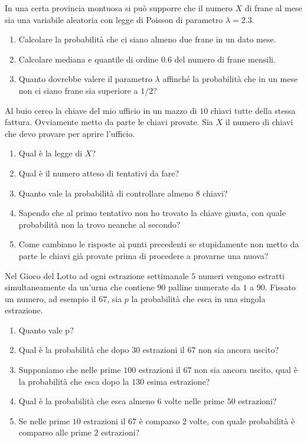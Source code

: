 
In una certa provincia montuosa si può supporre che il numero $X$ di frane al mese sia una variabile aleatoria con legge di Poisson di parametro $\lambda =2.3$.
\begin{enumerate}
\item Calcolare la probabilità che ci siano almeno due frane in un dato mese.
\item Calcolare mediana e quantile di ordine $0.6$ del numero di frane mensili.
\item Quanto dovrebbe valere il parametro $\lambda $ affinché la probabilità che in un mese non ci siano frane sia superiore a $1/2$?
\end{enumerate}

\Esercizio{}

Al buio cerco la chiave del mio ufficio in un mazzo di $10$ chiavi tutte della stessa fattura. Ovviamente metto da parte le chiavi provate. Sia $X$ il numero di chiavi che devo provare per aprire l'ufficio.
\begin{enumerate}
\item Qual è la legge di $X$?
\item Qual è il numero atteso di tentativi da fare?
\item Quanto vale la probabilità di controllare almeno $8$ chiavi?
\item Sapendo che al primo tentativo non ho trovato la chiave giusta, con quale probabilità non la trovo neanche al secondo?
\item Come cambiano le risposte ai punti precedenti se stupidamente non metto da parte le chiavi già provate prima di procedere a provarne una nuova?
\end{enumerate}

\Esercizio{}

Nel Gioco del Lotto ad ogni estrazione settimanale $5$ numeri vengono estratti simultaneamente da un'urna che contiene $90$ palline numerate da $1$ a $90$. Fissato un numero, ad esempio il $67$, sia $p$ la probabilità che esca in una singola estrazione.
\begin{enumerate}
\item Quanto vale p?
\item Qual è la probabilità che dopo $30$ estrazioni il $67$ non sia ancora uscito?
\item Supponiamo che nelle prime $100$ estrazioni il $67$ non sia ancora uscito, qual è la probabilità che esca dopo la $130$ esima estrazione?
\item Qual è la probabilità che esca almeno $6$ volte nelle prime $50$ estrazioni?
\item Se nelle prime $10$ estrazioni il $67$ è comparso $2$ volte, con quale probabilità è comparso alle prime $2$ estrazioni?
\end{enumerate}

